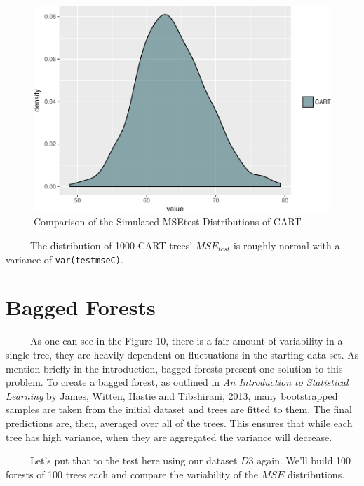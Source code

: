 \documentclass[12pt,twoside]{reedthesis}
\begin{document}
  \begin{figure}[htbp]
  \centering
  \includegraphics{Thesis_files/figure-latex/cartmse-1.pdf}
  \caption{\label{fig:cartmse}Comparison of the Simulated MSEtest
  Distributions of CART}
  \end{figure}
  
  ~~~~~The distribution of 1000 CART trees' \(MSE_{test}\) is roughly
  normal with a variance of \texttt{var(testmseC)}.
  
  \section{Bagged Forests}\label{bagged-forests}
  
  ~~~~~As one can see in the Figure 10, there is a fair amount of
  variability in a single tree, they are heavily dependent on fluctuations
  in the starting data set. As mention briefly in the introduction, bagged
  forests present one solution to this problem. To create a bagged forest,
  as outlined in \emph{An Introduction to Statistical Learning} by James,
  Witten, Hastie and Tibshirani, 2013, many bootstrapped samples are taken
  from the initial dataset and trees are fitted to them. The final
  predictions are, then, averaged over all of the trees. This ensures that
  while each tree has high variance, when they are aggregated the variance
  will decrease.
  
  ~~~~~Let's put that to the test here using our dataset \(D3\) again.
  We'll build 100 forests of 100 trees each and compare the variability of
  the \(MSE\) distributions.
  
\end{document}
